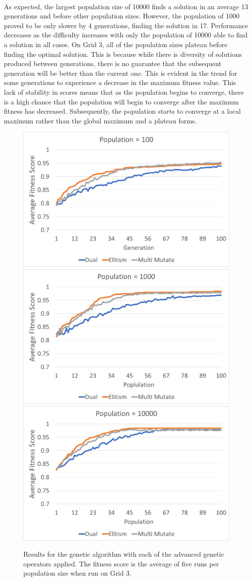 \documentclass[10pt]{article}
\begin{document}
\paragraph{}
As expected, the largest population size of 10000 finds a solution in an average 13 generations and before other population sizes. However, the population of 1000 proved to be only slower by 4 generations, finding the solution in 17. Performance decreases as the difficulty increases with only the population of 10000 able to find a solution in all cases. On Grid 3, all of the population sizes plateau before finding the optimal solution. This is because while there is diversity of solutions produced between generations, there is no guarantee that the subsequent generation will be better than the current one. This is evident in the trend for some generations to experience a decrease in the maximum fitness value. This lack of stability in scores means that as the population begins to converge, there is a high chance that the population will begin to converge after the maximum fitness has decreased. Subsequently, the population starts to converge at a local maximum rather than the global maximum and a plateau forms.  

\begin{figure}[htp]

\centering
\includegraphics[width=.329\linewidth]{i/one_true_100.png}\hfill
\includegraphics[width=.329\linewidth]{i/one_true_1000.png}\hfill
\includegraphics[width=.329\linewidth]{i/one_true_10000.png}

\caption{Results for the genetic algorithm with each of the advanced genetic operators applied. The fitness score is the average of five runs per population size when run on Grid 3.}
\label{fig:one_true}

\end{figure}
\end{document}
